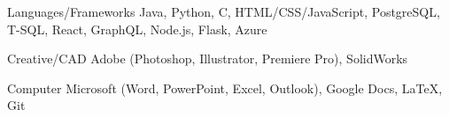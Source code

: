 
\begin{cvskills}
  \cvskill
  {Languages/Frameworks} %
  {Java, Python, C, HTML/CSS/JavaScript, PostgreSQL, T-SQL, React, GraphQL, Node.js, Flask, Azure} %

  \cvskill
  {Creative/CAD} %
  {Adobe (Photoshop, Illustrator, Premiere Pro), SolidWorks} %

  \cvskill
  {Computer} %
  {Microsoft (Word, PowerPoint, Excel, Outlook), Google Docs, LaTeX, Git} %
\end{cvskills}
